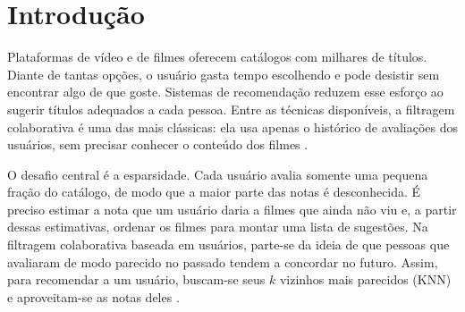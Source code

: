\documentclass[conference]{IEEEtran}
\begin{document}
\vspace{3pt}


\section{Introdu\c{c}\~ao}
Plataformas de v\'ideo e de filmes oferecem cat\'alogos com milhares de t\'itulos. Diante de tantas op\c{c}\~oes, o usu\'ario gasta tempo escolhendo e pode desistir sem encontrar algo de que goste. Sistemas de recomenda\c{c}\~ao reduzem esse esfor\c{c}o ao sugerir t\'itulos adequados a cada pessoa. Entre as t\'ecnicas dispon\'iveis, a filtragem colaborativa \'e uma das mais cl\'assicas: ela usa apenas o hist\'orico de avalia\c{c}\~oes dos usu\'arios, sem precisar conhecer o conte\'udo dos filmes \cite{resnick1994,desrosiers2011}.

O desafio central \'e a esparsidade. Cada usu\'ario avalia somente uma pequena fra\c{c}\~ao do cat\'alogo, de modo que a maior parte das notas \'e desconhecida. \'E preciso estimar a nota que um usu\'ario daria a filmes que ainda n\~ao viu e, a partir dessas estimativas, ordenar os filmes para montar uma lista de sugest\~oes. Na filtragem colaborativa baseada em usu\'arios, parte-se da ideia de que pessoas que avaliaram de modo parecido no passado tendem a concordar no futuro. Assim, para recomendar a um usu\'ario, buscam-se seus $k$ vizinhos mais parecidos (KNN) e aproveitam-se as notas deles \cite{resnick1994,herlocker1999}.
\end{document}
